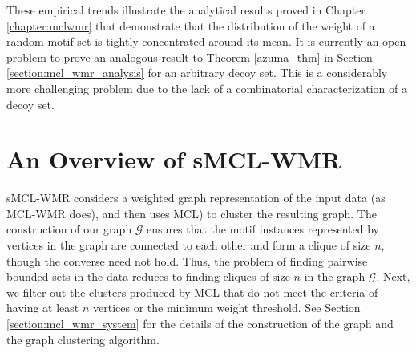These empirical trends illustrate the analytical results proved in Chapter \ref{chapter:mclwmr} that demonstrate that the distribution of the weight of a random motif set is tightly concentrated around its mean. It is currently an open problem to prove an analogous result to Theorem \ref{azuma_thm} in Section \ref{section:mcl_wmr_analysis} for an arbitrary decoy set.  This is a considerably more challenging problem due to the lack of a combinatorial characterization of a decoy set.  

\section{An Overview of sMCL-WMR} \label{smcl_wmr_tail_values}

sMCL-WMR considers a weighted graph representation of the input data (as MCL-WMR does), and then uses MCL) \cite{vD00} to cluster the resulting graph. The construction of our graph $\mathcal{G}$ ensures that the motif instances represented by vertices in the graph are connected to each other and form a clique of size $n$, though the converse need not hold. Thus, the problem of finding pairwise bounded sets in the data reduces to finding cliques of size $n$ in the graph $\mathcal{G}$.  Next, we filter out the clusters produced by MCL that do not meet the criteria of having at least $n$ vertices or the minimum weight threshold. See Section \ref{section:mcl_wmr_system} for the details of the construction of the graph and the graph clustering algorithm.  

